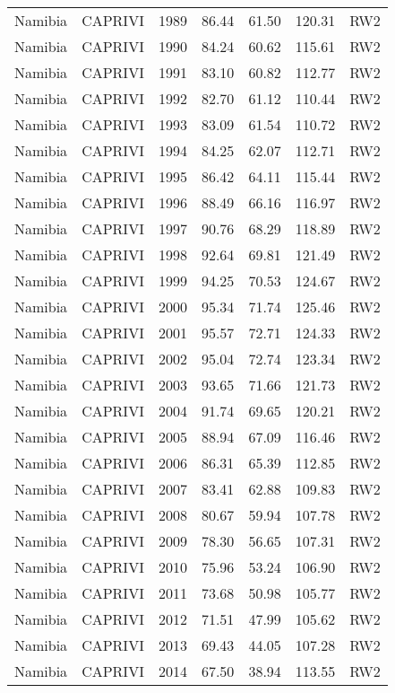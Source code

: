 \begin{longtable}{lllrrrl}
  Namibia & CAPRIVI & 1989 & 86.44 & 61.50 & 120.31 & RW2 \\ 
  Namibia & CAPRIVI & 1990 & 84.24 & 60.62 & 115.61 & RW2 \\ 
  Namibia & CAPRIVI & 1991 & 83.10 & 60.82 & 112.77 & RW2 \\ 
  Namibia & CAPRIVI & 1992 & 82.70 & 61.12 & 110.44 & RW2 \\ 
  Namibia & CAPRIVI & 1993 & 83.09 & 61.54 & 110.72 & RW2 \\ 
  Namibia & CAPRIVI & 1994 & 84.25 & 62.07 & 112.71 & RW2 \\ 
  Namibia & CAPRIVI & 1995 & 86.42 & 64.11 & 115.44 & RW2 \\ 
  Namibia & CAPRIVI & 1996 & 88.49 & 66.16 & 116.97 & RW2 \\ 
  Namibia & CAPRIVI & 1997 & 90.76 & 68.29 & 118.89 & RW2 \\ 
  Namibia & CAPRIVI & 1998 & 92.64 & 69.81 & 121.49 & RW2 \\ 
  Namibia & CAPRIVI & 1999 & 94.25 & 70.53 & 124.67 & RW2 \\ 
  Namibia & CAPRIVI & 2000 & 95.34 & 71.74 & 125.46 & RW2 \\ 
  Namibia & CAPRIVI & 2001 & 95.57 & 72.71 & 124.33 & RW2 \\ 
  Namibia & CAPRIVI & 2002 & 95.04 & 72.74 & 123.34 & RW2 \\ 
  Namibia & CAPRIVI & 2003 & 93.65 & 71.66 & 121.73 & RW2 \\ 
  Namibia & CAPRIVI & 2004 & 91.74 & 69.65 & 120.21 & RW2 \\ 
  Namibia & CAPRIVI & 2005 & 88.94 & 67.09 & 116.46 & RW2 \\ 
  Namibia & CAPRIVI & 2006 & 86.31 & 65.39 & 112.85 & RW2 \\ 
  Namibia & CAPRIVI & 2007 & 83.41 & 62.88 & 109.83 & RW2 \\ 
  Namibia & CAPRIVI & 2008 & 80.67 & 59.94 & 107.78 & RW2 \\ 
  Namibia & CAPRIVI & 2009 & 78.30 & 56.65 & 107.31 & RW2 \\ 
  Namibia & CAPRIVI & 2010 & 75.96 & 53.24 & 106.90 & RW2 \\ 
  Namibia & CAPRIVI & 2011 & 73.68 & 50.98 & 105.77 & RW2 \\ 
  Namibia & CAPRIVI & 2012 & 71.51 & 47.99 & 105.62 & RW2 \\ 
  Namibia & CAPRIVI & 2013 & 69.43 & 44.05 & 107.28 & RW2 \\ 
  Namibia & CAPRIVI & 2014 & 67.50 & 38.94 & 113.55 & RW2 \\ 

\end{longtable}
